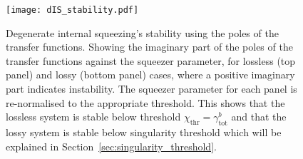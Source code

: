 

\begin{figure}
	\centering
	\texttt{[image: dIS\_stability.pdf]}
	\caption{ Degenerate internal squeezing's stability using the poles of the transfer functions. Showing the imaginary part of the poles of the transfer functions against the squeezer parameter, for lossless (top panel) and lossy (bottom panel) cases, where a positive imaginary part indicates instability. The squeezer parameter for each panel is re-normalised to the appropriate threshold. This shows that the lossless system is stable below threshold $\chi_\text{thr}=\gamma^b_\text{tot}$ and that the lossy system is stable below singularity threshold which will be explained in Section~\ref{sec:singularity_threshold}.}
	\label{fig:dIS_stability}
\end{figure}


